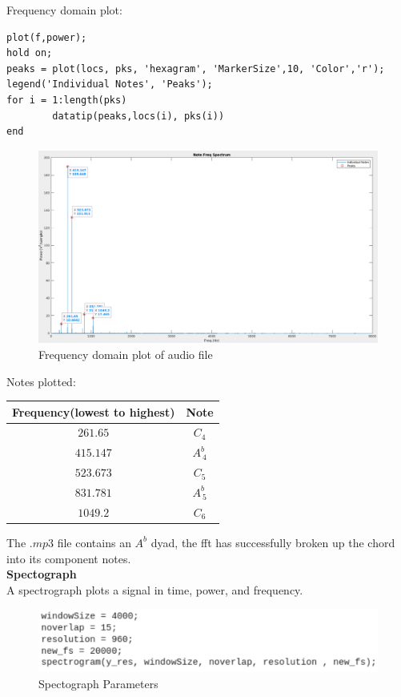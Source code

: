 \documentclass[12pt,a4paper]{article}
\begin{document}
Frequency domain plot:
	\begin{lstlisting}
plot(f,power);
hold on;
peaks = plot(locs, pks, 'hexagram', 'MarkerSize',10, 'Color','r');
legend('Individual Notes', 'Peaks');
for i = 1:length(pks)
        datatip(peaks,locs(i), pks(i))
end
	\end{lstlisting}
\newpage
\begin{figure}[h]
	\begin{center}
		\includegraphics[width=\linewidth]{frequency_domain_plot}
	\end{center}
	\caption{Frequency domain plot of audio file}
\end{figure}
Notes plotted:\\
\begin{center}
	\begin{tabular}{|c|c|}
		\hline
		Frequency(lowest to highest) & Note\\
		\hline
		$261.65$ & $C_4$\\
		$415.147$ & $A^b_{\ 4}$\\
		$523.673$ & $C_5$\\
		$831.781$ & $A^{b}_{\ 5}$\\
		$1049.2$ & $C_6$\\
		\hline
	\end{tabular}
\end{center}
The $.mp3$ file contains an $A^b$ dyad, the fft has successfully broken up the chord into its component
notes.\\
\newpage
\textbf{Spectograph}\\
A spectrograph plots a signal in time, power, and frequency.\\
\begin{figure}[H]
	\begin{center}
		\includegraphics[width=0.7\linewidth]{Spectograph_text}
	\end{center}
	\caption{Spectograph Parameters}
\end{figure}
\end{document}
